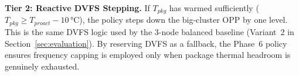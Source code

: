 \textbf{Tier 2: Reactive DVFS Stepping.}
If $T_{pkg}$ has warmed sufficiently ($T_{pkg} \geq T_{proact} - 10\,\text{°C}$), the policy steps down the big-cluster OPP by one level. This is the same DVFS logic used by the 3-node balanced baseline (Variant~2 in Section~\ref{sec:evaluation}). By reserving DVFS as a fallback, the Phase~6 policy ensures frequency capping is employed only when package thermal headroom is genuinely exhausted.
